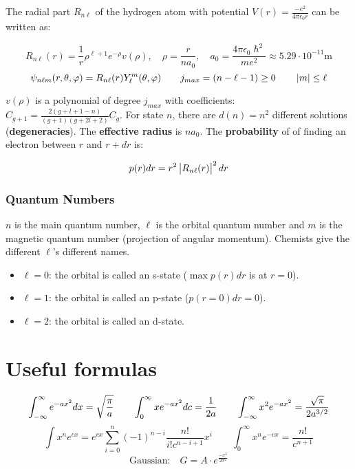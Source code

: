 \documentclass{article}
\begin{document}
The radial part $R_{n\ell}$ of the hydrogen atom with potential $V(r) = \frac{-e^2}{4\pi\epsilon_0 r}$ can be written as:

$$R_{n\ell}(r) = \frac{1}{r} \rho^{\ell+1} e^{-\rho} v(\rho), \quad \rho = \frac{r}{n a_0}, \quad a_0 = \frac{4\pi \epsilon_0 \hslash^2}{m e^2} \approx  5.29 \cdot 10^{-11} \si{\meter}$$
$$\psi_{n\ell m}(r,\theta,\varphi) = R_{n\ell}(r) Y_\ell^m(\theta,\varphi) \qquad  j_{max} = (n-\ell-1) \geq 0 \qquad \left| m \right| \leq \ell$$

$v(\rho)$ is a polynomial of degree $j_{max}$ with coefficients: $C_{g+1} = \frac{2(g+l+1-n)}{(g+1)(g+2l+2)} C_g$. 
For state $n$, there are $d(n) = n^2$ different solutions (\textbf{degeneracies}). 
The \textbf{effective radius} is $n a_0$.
The \textbf{probability} of of finding an electron between $r$ and $r+dr$ is:

$$p(r) dr = r^2 \left| R_{n\ell}(r) \right|^2 dr$$

\subsubsection{Quantum Numbers}

$n$ is the main quantum number, $\ell$ is the orbital quantum number and $m$ is the magnetic quantum number (projection of angular momentum).
Chemists give the different $\ell$'s different names. 
\begin{itemize}
	\item $\ell = 0$: the orbital is called an s-state ($\max p(r) dr$ is at $r = 0$). 
	\item $\ell = 1$: the orbital is called an p-state ($p(r=0) dr = 0$).
	\item $\ell = 2$: the orbital is called an d-state.
\end{itemize}

\section{Useful formulas}

$$\int_{-\infty}^{\infty} e^{-a x^2} dx = \sqrt{\frac{\pi}{a}} \qquad \int_0^\infty x e^{-a x^2} dc = \frac{1}{2a} \qquad \int_{-\infty}^{\infty} x^2 e^{-a x^2} = \frac{\sqrt{\pi}}{2a^{3/2}}$$
$$\int x^n e^{cx} = e^{cx} \sum_{i=0}^{n} (-1)^{n-i} \frac{n!}{i! c^{n-i+1}} x^i \qquad \int_0^\infty x^n e^{-cx} = \frac{n!}{c^{n+1}}$$
$$\text{Gaussian:} \quad G = A \cdot e^{\frac{-x^2}{2\sigma^2}}$$
\end{document}

